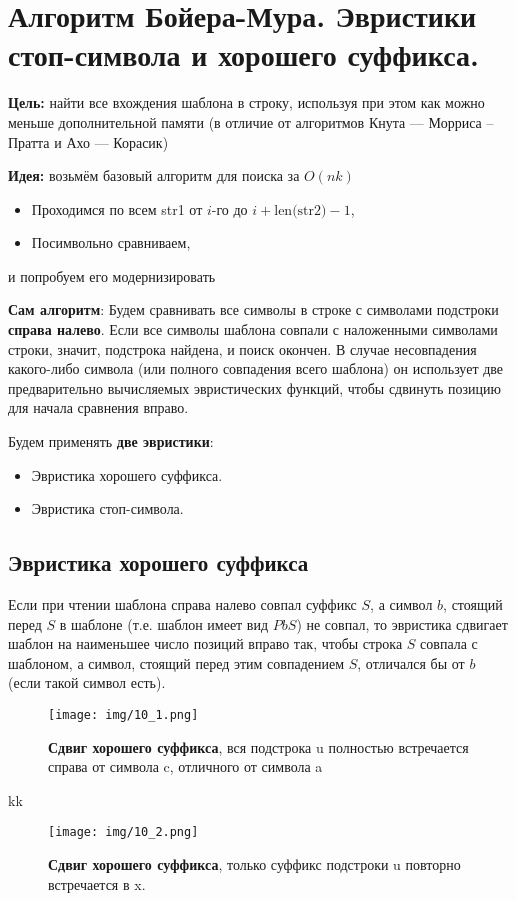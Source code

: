 \section{Алгоритм Бойера-Мура. Эвристики стоп-символа и хорошего суффикса.}

\textbf{Цель:} найти все вхождения шаблона в строку, используя при этом как можно меньше дополнительной памяти (в отличие от алгоритмов Кнута --- Морриса -- Пратта и Ахо --- Корасик)

\textbf{Идея:} возьмём базовый алгоритм для поиска за $O(nk)$
\begin{itemize}
	\item Проходимся по всем \textsf{str1} от $i$-го до $i+\text{len(str2)}-1$,
	\item Посимвольно сравниваем,
\end{itemize}
и попробуем его модернизировать

\textbf{Сам алгоритм}:
Будем сравнивать все символы в строке с символами подстроки \textbf{справа налево}. 
Если все символы шаблона совпали с наложенными символами строки, значит, подстрока найдена, и поиск окончен. 
В случае несовпадения какого-либо символа (или полного совпадения всего шаблона) он использует две предварительно вычисляемых эвристических функций, чтобы сдвинуть позицию для начала сравнения вправо.

Будем применять \textbf{две эвристики}:
\begin{itemize}
	\item Эвристика хорошего суффикса.
	\item Эвристика стоп-символа.
\end{itemize}

\subsection{Эвристика хорошего суффикса}

Если при чтении шаблона справа налево совпал суффикс $S$, а символ $b$, стоящий перед $S$ в шаблоне (т.е. шаблон имеет вид $PbS$) не совпал, то эвристика сдвигает шаблон на наименьшее число позиций вправо так, чтобы строка $S$ совпала с шаблоном, а символ, стоящий перед этим совпадением $S$, отличался бы от $b$ (если такой символ есть).

\begin{figure}[h!]
	\centering
	\texttt{[image: img/10\_1.png]}
	\captionsetup{labelformat=empty}
	\caption{\textbf{Сдвиг хорошего суффикса}, вся подстрока u полностью встречается справа от символа c, отличного от символа a}
\end{figure}
kk
\begin{figure}[h!]
	\centering
	\texttt{[image: img/10\_2.png]}
	\captionsetup{labelformat=empty}
	\caption{\textbf{Сдвиг хорошего суффикса}, только суффикс подстроки u повторно встречается в x.}
\end{figure}


